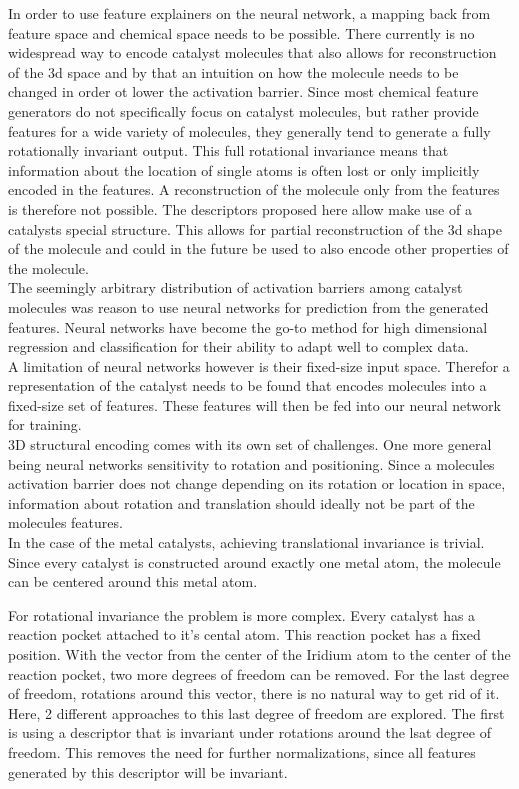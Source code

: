 In order to use feature explainers on the neural network, a mapping back from feature space and chemical space needs to be possible.
There currently is no widespread way to encode catalyst molecules that also allows for 
reconstruction of the 3d space and by that an intuition on how the molecule needs to be changed in order ot lower the activation barrier.
Since most chemical feature generators do not specifically focus on catalyst molecules,
but rather provide features for a wide variety of molecules, they generally tend to generate a fully rotationally invariant output.
This full rotational invariance means that information about the location of single atoms is often lost or only implicitly encoded in the features.
A reconstruction of the molecule only from the features is therefore not possible.
The descriptors proposed here allow make use of a catalysts special structure.
This allows for partial reconstruction of the 3d shape of the molecule and could in the future be used to also encode 
other properties of the molecule.
\\
The seemingly arbitrary distribution of activation barriers among catalyst molecules  was reason to use neural networks for prediction from the generated features.
Neural networks have become the go-to method for high dimensional regression and classification for their ability to adapt well to complex data.
\\
A limitation of neural networks however is their fixed-size input space.
Therefor a representation of the catalyst needs to be found that encodes molecules into a fixed-size set of features.
These features will then be fed into our neural network for training. 
\\
3D structural encoding comes with its own set of challenges. 
One more general being neural networks sensitivity to rotation and positioning.
Since a molecules activation barrier does not change depending on its rotation or location in space, 
information about rotation and translation should ideally not be part of the molecules features.
\\
In the case of the metal catalysts, achieving translational invariance is trivial.
Since every catalyst is constructed around exactly one metal atom, the molecule can be centered around this metal atom.

For rotational invariance the problem is more complex.
Every catalyst has a reaction pocket attached to it's cental atom.
This reaction pocket has a fixed position.
With the vector from the center of the Iridium atom to the center of the reaction pocket, two more degrees of freedom can be removed.
For the last degree of freedom, rotations around this vector, there is no natural way to get rid of it.
Here, 2 different approaches to this last degree of freedom are explored.
The first is using a descriptor that is invariant under rotations around the lsat degree of freedom.
This removes the need for further normalizations, since all features generated by this descriptor will be invariant.

